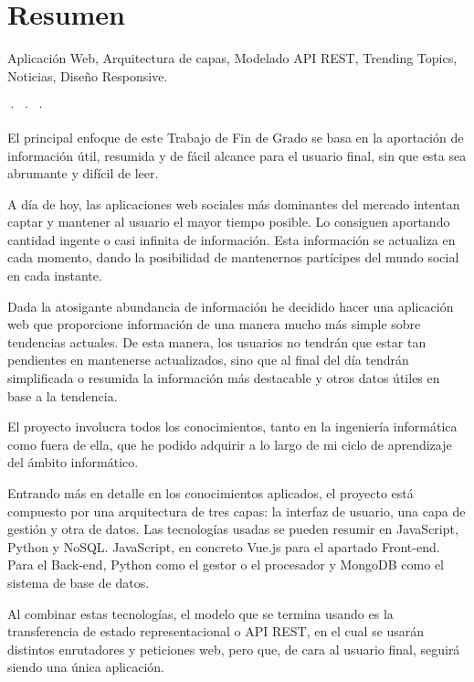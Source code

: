 \begingroup

\chapter*{Resumen}

\noindent{} Aplicación Web, Arquitectura de capas, Modelado API REST, Trending Topics, Noticias, Diseño Responsive.
\begin{center}
· · ·
\end{center}

El principal enfoque de este Trabajo de Fin de Grado se basa en la aportación de información útil, resumida y de fácil alcance para el usuario final, sin que esta sea abrumante y difícil de leer.

\vspace{0.3cm}

A día de hoy, las aplicaciones web sociales más dominantes del mercado intentan captar y mantener al usuario el mayor tiempo posible. Lo consiguen aportando cantidad ingente o casi infinita de información. Esta información se actualiza en cada momento, dando la posibilidad de mantenernos partícipes del mundo social en cada instante.

\vspace{0.3cm}

Dada la atosigante abundancia de información he decidido hacer una aplicación web que proporcione información de una manera mucho más simple sobre tendencias actuales. De esta manera, los usuarios no tendrán que estar tan pendientes en mantenerse actualizados, sino que al final del día tendrán simplificada o resumida la información más destacable y otros datos útiles en base a la tendencia.

\vspace{0.3cm}

El proyecto involucra todos los conocimientos, tanto en la ingeniería informática como fuera de ella, que he podido adquirir a lo largo de mi ciclo de aprendizaje del ámbito informático.

\vspace{0.3cm}

Entrando más en detalle en los conocimientos aplicados, el proyecto está compuesto por una arquitectura de tres capas: la interfaz de usuario, una capa de gestión y otra de datos. Las tecnologías usadas se pueden resumir en JavaScript, Python y NoSQL. JavaScript, en concreto Vue.js para el apartado Front-end. Para el Back-end, Python como el gestor o el procesador y MongoDB como el sistema de base de datos.

\vspace{0.3cm}

Al combinar estas tecnologías, el modelo que se termina usando es la transferencia de estado representacional o API REST, en el cual se usarán distintos enrutadores y peticiones web, pero que, de cara al usuario final, seguirá siendo una única aplicación.

\vfill
